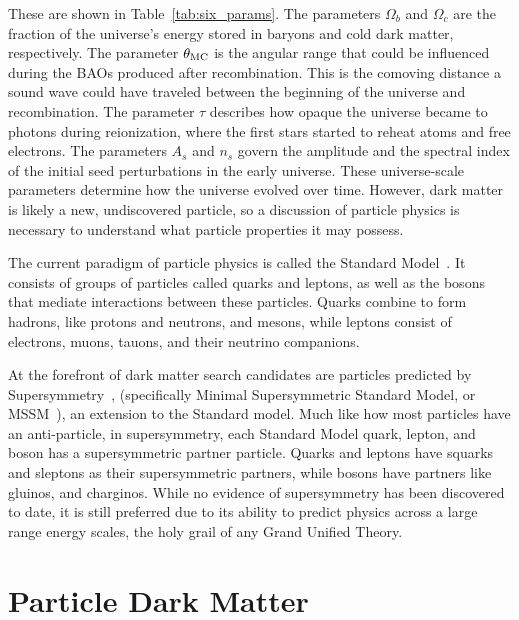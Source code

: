 These are shown in Table~\ref{tab:six_params}.
The parameters $\Omega_b$ and $\Omega_c$ are the fraction of the universe's energy stored in baryons and cold dark matter, respectively.
The parameter $\theta_{\textrm{MC}}$ is the angular range that could be influenced during the BAOs produced after recombination.
This is the comoving distance a sound wave could have traveled between the beginning of the universe and recombination.
The parameter $\tau$ describes how opaque the universe became to photons during reionization, where the first stars started to reheat atoms and free electrons.
The parameters $A_s$ and $n_s$ govern the amplitude and the spectral index of the initial seed perturbations in the early universe.
These universe-scale parameters determine how the universe evolved over time.
However, dark matter is likely a new, undiscovered particle,  so a discussion of particle physics is necessary to understand what particle properties it may possess.


The current paradigm of particle physics is called the Standard Model~\cite{standardmodel}.
It consists of groups of particles called quarks and leptons, as well as the bosons that mediate interactions between these particles.
Quarks combine to form hadrons, like protons and neutrons, and mesons, while leptons consist of electrons, muons, tauons, and their neutrino companions.

At the forefront of dark matter search candidates are particles predicted by Supersymmetry~\cite{Jungman:1995df}, (specifically Minimal Supersymmetric Standard Model, or MSSM~\cite{MSSM,supersym1}), an extension to the Standard model.
Much like how most particles have an anti-particle, in supersymmetry, each Standard Model quark, lepton, and boson has a supersymmetric partner particle.
Quarks and leptons have squarks and sleptons as their supersymmetric partners, while bosons have partners like gluinos, and charginos.
While no evidence of supersymmetry has been discovered to date, it is still preferred due to its ability to predict physics across a large range energy scales, the holy grail of any Grand Unified Theory.


\section{Particle Dark Matter}\label{sec_particledm}



